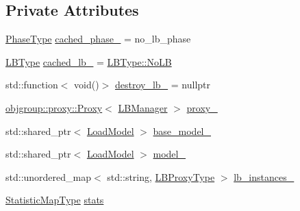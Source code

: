 \subsection*{Private Attributes}
\begin{DoxyCompactItemize}
\item 
\hyperlink{namespacevt_a46ce6733d5cdbd735d561b7b4029f6d7}{Phase\+Type} \hyperlink{structvt_1_1vrt_1_1collection_1_1balance_1_1_l_b_manager_aa15bf182a0d70f1fc756ac8893422777}{cached\+\_\+phase\+\_\+} = no\+\_\+lb\+\_\+phase
\item 
\hyperlink{namespacevt_1_1vrt_1_1collection_1_1balance_ac4f99693509affcc67db182d4aad9b5c}{L\+B\+Type} \hyperlink{structvt_1_1vrt_1_1collection_1_1balance_1_1_l_b_manager_aa21ee592ddcc09c269e546c0ebf47fd3}{cached\+\_\+lb\+\_\+} = \hyperlink{namespacevt_1_1vrt_1_1collection_1_1balance_ac4f99693509affcc67db182d4aad9b5cad12268b59a4f1098aee001f9a1750020}{L\+B\+Type\+::\+No\+LB}
\item 
std\+::function$<$ void()$>$ \hyperlink{structvt_1_1vrt_1_1collection_1_1balance_1_1_l_b_manager_a31af388e759240311470c17ec569155c}{destroy\+\_\+lb\+\_\+} = nullptr
\item 
\hyperlink{structvt_1_1objgroup_1_1proxy_1_1_proxy}{objgroup\+::proxy\+::\+Proxy}$<$ \hyperlink{structvt_1_1vrt_1_1collection_1_1balance_1_1_l_b_manager}{L\+B\+Manager} $>$ \hyperlink{structvt_1_1vrt_1_1collection_1_1balance_1_1_l_b_manager_a4fef6bf68a7aee9980270ceeb5df0c2b}{proxy\+\_\+}
\item 
std\+::shared\+\_\+ptr$<$ \hyperlink{structvt_1_1vrt_1_1collection_1_1balance_1_1_load_model}{Load\+Model} $>$ \hyperlink{structvt_1_1vrt_1_1collection_1_1balance_1_1_l_b_manager_ace781095ef59c156a0b23dea6dea70db}{base\+\_\+model\+\_\+}
\item 
std\+::shared\+\_\+ptr$<$ \hyperlink{structvt_1_1vrt_1_1collection_1_1balance_1_1_load_model}{Load\+Model} $>$ \hyperlink{structvt_1_1vrt_1_1collection_1_1balance_1_1_l_b_manager_a4298255e00b2012d3417a63130dc91c3}{model\+\_\+}
\item 
std\+::unordered\+\_\+map$<$ std\+::string, \hyperlink{structvt_1_1vrt_1_1collection_1_1balance_1_1_l_b_manager_a8b1a7735366beb85c2c2ccc3912cdd80}{L\+B\+Proxy\+Type} $>$ \hyperlink{structvt_1_1vrt_1_1collection_1_1balance_1_1_l_b_manager_aa25f8223d51a33ca1c583b56fd2a98c2}{lb\+\_\+instances\+\_\+}
\item 
\hyperlink{structvt_1_1vrt_1_1collection_1_1balance_1_1_l_b_manager_a3c6941b9c14a77e015047c659b817a85}{Statistic\+Map\+Type} \hyperlink{structvt_1_1vrt_1_1collection_1_1balance_1_1_l_b_manager_a1cd6e1eace2e827d04679d2a923d7325}{stats}

\end{DoxyCompactItemize}
